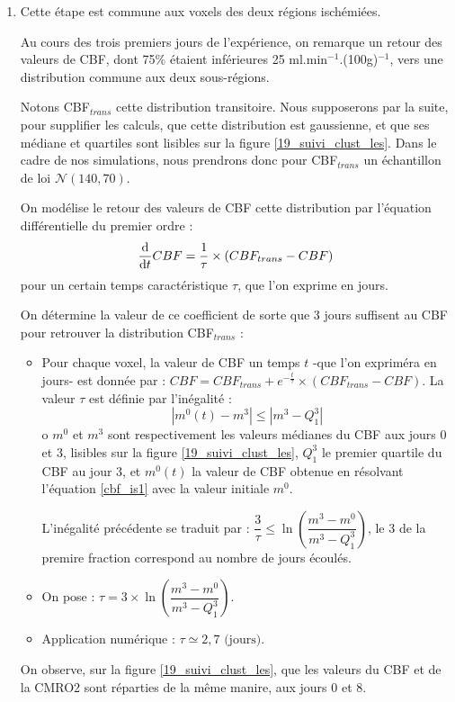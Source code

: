 \begin{enumerate}[label=\textbf{(L\'esion 1 - \arabic*)}]
\item Cette \'etape est commune aux voxels des deux r\'egions isch\'emi\'ees.

\par
Au cours des trois premiers jours de l'exp\'erience, on remarque un retour des valeurs de CBF, %
dont 75\% \'etaient inf\'erieures  25 ml.min${}^{-1}$.(100g)${}^{-1}$, vers une distribution commune aux deux sous-r\'egions.

\par
Notons CBF${}_{trans}$ cette distribution transitoire. Nous supposerons par la suite, pour supplifier les calculs, %
que cette distribution est gaussienne, et que ses m\'ediane et quartiles sont lisibles sur la figure \ref{19_suivi_clust_les}. %
Dans le cadre de nos simulations, nous prendrons donc pour CBF${}_{trans}$ un \'echantillon de loi $\mathcal{N}(140,70)$.

\par
On mod\'elise le retour des valeurs de CBF  cette distribution par l'\'equation diff\'erentielle du premier ordre :
\begin{equation}
\der{CBF}=\frac{1}{\tau}\times \left(CBF_{trans}-CBF\right)%
\label{cbf_is1}
\end{equation}
pour un certain temps caract\'eristique $\tau$, que l'on exprime en jours.

\par
On d\'etermine la valeur de ce coefficient de sorte que 3 jours suffisent au CBF pour retrouver la distribution CBF${}_{trans}$ :
\begin{itemize}
\item Pour chaque voxel, la valeur de CBF  un temps $t$ -que l'on exprim\'era en jours- est donn\'ee par : %
$CBF=CBF_{trans}+e^{-\frac{t}{\tau}}\times\left(CBF_{trans}-CBF\right)$. La valeur $\tau$ est d\'efinie par l'in\'egalit\'e :
\[|m^0(t)-m^3|\leq|m^3-Q_1^3|\]
o $m^0$ et $m^3$ sont respectivement les valeurs m\'edianes du CBF aux jours 0 et 3, lisibles sur la figure \ref{19_suivi_clust_les}, %
$Q_1^3$ le premier quartile du CBF au jour 3, et $m^0(t)$ la valeur de CBF obtenue en r\'esolvant l'\'equation \ref{cbf_is1} avec la valeur initiale $m^0$.

\par
L'in\'egalit\'e pr\'ec\'edente se traduit par : $\dfrac{3}{\tau}\leq\ln\left(\dfrac{m^3-m^0}{m^3-Q^3_1}\right)$, %
le 3 de la premire fraction correspond au nombre de jours \'ecoul\'es.
%
\item On pose : $\tau =3\times\ln\left(\dfrac{m^3-m^0}{m^3-Q^3_1}\right)$.
%
\item Application num\'erique : $\tau \simeq 2,7 \text{ (jours)}$.
\end{itemize}
%
On observe, sur la figure \ref{19_suivi_clust_les}, que les valeurs du CBF et de la CMRO2 sont r\'eparties de la m\^eme manire, %
aux jours 0 et 8.


\end{enumerate}
